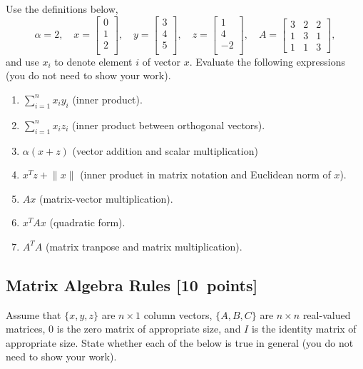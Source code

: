 \documentclass{article}
\newcommand{\blu}[1]{{\textcolor{blu}{#1}}}
\let\ask\blu
\newcommand\pts[1]{\textcolor{pointscolour}{[#1~points]}}
\newcommand{\norm}[1]{\lVert #1 \rVert}
\begin{document}
  Use the definitions below,
  \[
  \alpha = 2,\quad
  x = \left[\begin{array}{c}
  0\\
  1\\
  2\\
  \end{array}\right], \quad
  y = \left[\begin{array}{c}
  3\\
  4\\
  5\\
  \end{array}\right],\quad
  z = \left[\begin{array}{c}
  1\\
  4\\
  -2\\
  \end{array}\right],\quad
  A = \left[\begin{array}{ccc}
  3 & 2 & 2\\
  1 & 3 & 1\\
  1 & 1 & 3
  \end{array}\right],
  \]
  and use $x_i$ to denote element $i$ of vector $x$.
  \ask{Evaluate the following expressions} (you do not need to show your work).
  \begin{enumerate}
  \item $\sum_{i=1}^n x_iy_i$ (inner product).
  \item $\sum_{i=1}^n x_i z_i$ (inner product between orthogonal vectors).
  \item $\alpha(x+z)$ (vector addition and scalar multiplication)
  \item $x^Tz + \norm{x}$ (inner product in matrix notation and Euclidean norm of $x$).
  \item $Ax$ (matrix-vector multiplication).
  \item $x^TAx$ (quadratic form).
  \item $A^TA$ (matrix tranpose and matrix multiplication).
  \end{enumerate}

  \subsection{Matrix Algebra Rules \pts{10}}

  Assume that $\{x,y,z\}$ are $n \times 1$ column vectors, $\{A,B,C\}$ are $n \times n$ real-valued matrices, $0$ is the zero matrix of appropriate size, and $I$ is the identity matrix of appropriate size. \ask{State whether each of the below is true in general} (you do not need to show your work).
\end{document}
